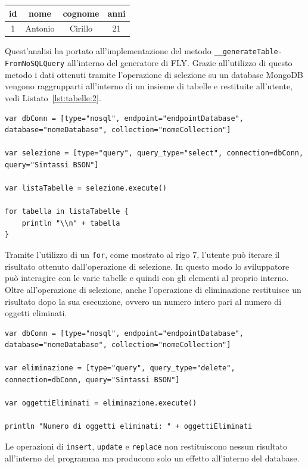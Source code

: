 \begin{center}
\begin{tabular}{||c c c c||} 
 \hline
 id & nome & cognome & anni \\ [0.5ex] 
 \hline\hline
 1 & Antonio & Cirillo & 21 \\ 
 \hline
\end{tabular}
\end{center}
Quest'analisi ha portato all'implementazione del metodo \verb|__generateTable-| \verb|FromNoSQLQuery| all'interno del generatore di FLY. Grazie all'utilizzo di questo metodo i dati ottenuti tramite l'operazione di selezione su un database MongoDB vengono raggrupparti all'interno di un insieme di tabelle e restituite all'utente, vedi Listato~\ref{lst:tabelle:2}.
\begin{lstlisting}[language=FLY,caption={Stampa a schermo di tutte le tabelle ottenute tramite l'esecuzione di una query di selezione su un database MongoDB.}, label={lst:tabelle:2}]
var dbConn = [type="nosql", endpoint="endpointDatabase", database="nomeDatabase", collection="nomeCollection"]

var selezione = [type="query", query_type="select", connection=dbConn, query="Sintassi BSON"]
		
var listaTabelle = selezione.execute()
	
for tabella in listaTabelle {
	println "\\n" + tabella
}
\end{lstlisting}
Tramite l'utilizzo di un \verb|for|, come mostrato al rigo 7, l'utente può iterare il risultato ottenuto dall'operazione di selezione. In questo modo lo sviluppatore può interagire con le varie tabelle e quindi con gli elementi al proprio interno. \\
Oltre all'operazione di selezione, anche l'operazione di eliminazione restituisce un risultato dopo la sua esecuzione, ovvero un numero intero pari al numero di oggetti eliminati.
\begin{lstlisting}[language=FLY,caption={Stampa a schermo degli elementi eliminati da un'operazione di eliminazione.}, label={lst:tabelle:3}]
var dbConn = [type="nosql", endpoint="endpointDatabase", database="nomeDatabase", collection="nomeCollection"]

var eliminazione = [type="query", query_type="delete", connection=dbConn, query="Sintassi BSON"]
		
var oggettiEliminati = eliminazione.execute()
	
println "Numero di oggetti eliminati: " + oggettiEliminati
\end{lstlisting}
Le operazioni di \verb|insert|, \verb|update| e \verb|replace| non restituiscono nessun risultato all'interno del programma ma producono solo un effetto all'interno del database.

